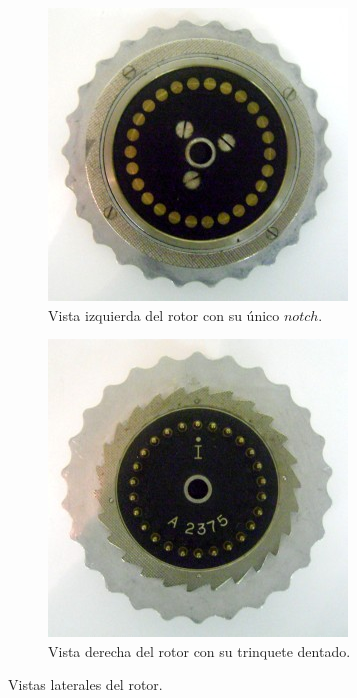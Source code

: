 \documentclass[a4paper,10pt]{article}
\begin{document}
\begin{figure}[h]

\begin{subfigure}{0.5\textwidth}
\includegraphics[width=1\linewidth]{rotor-view-left.jpg} 
\caption{Vista izquierda del rotor con su único $notch$.}
\label{fig:subim1}
\end{subfigure}
\begin{subfigure}{0.5\textwidth}
\includegraphics[width=0.97\linewidth]{rotor-view-right.jpg}
\caption{Vista derecha del rotor con su trinquete dentado.}
\label{fig:subim2}
\end{subfigure}

\caption{Vistas laterales del rotor.\cite{rijmenants}}
\label{fig:image2}
\end{figure}
\end{document}
